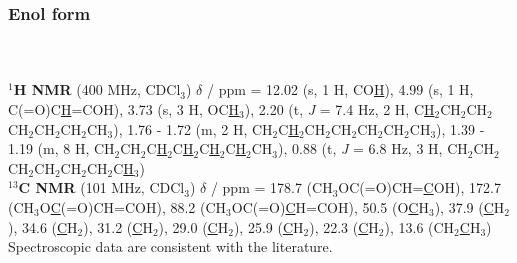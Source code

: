 \subsubsection*{Enol form }
\\[1\baselineskip]
\\[1\baselineskip]
\textbf{$^{1}$H NMR} (400 MHz, CDCl$_3$) $\delta$ / ppm = 
	12.02 (s, 1 H, CO\underline{H}), 
	4.99 (s, 1 H, C(=O)C\underline{H}=COH),
	3.73 (s, 3 H, OC\underline{H}$_3$), 
	2.20 (t, \textit{J} = 7.4 Hz, 2 H, C\underline{H}$_2$CH$_2$CH$_2$CH$_2$CH$_2$CH$_2$CH$_3$), 
	1.76 - 1.72 (m, 2 H, CH$_2$C\underline{H}$_2$CH$_2$CH$_2$CH$_2$CH$_2$CH$_3$),
	1.39 - 1.19 (m, 8 H, CH$_2$CH$_2$C\underline{H}$_2$C\underline{H}$_2$C\underline{H}$_2$C\underline{H}$_2$CH$_3$), 
	0.88 (t, \textit{J} = 6.8 Hz, 3 H, CH$_2$CH$_2$CH$_2$CH$_2$CH$_2$CH$_2$C\underline{H}$_3$)
	\\[1\baselineskip]
\textbf{$^{13}$C NMR} (101 MHz, CDCl$_3$) $\delta$ / ppm = 
	178.7 (CH$_3$OC(=O)CH=\underline{C}OH), 
	172.7 (CH$_3$O\underline{C}(=O)CH=COH), 
	88.2 (CH$_3$OC\-(=O)\underline{C}H=COH), 
	50.5 (O\underline{C}H$_3$),
	37.9 (\underline{C}H$_2$), 
	34.6 (\underline{C}H$_2$), 
	31.2 (\underline{C}H$_2$), 
	29.0 (\underline{C}H$_2$), 
	25.9 (\underline{C}H$_2$), 
	22.3 (\underline{C}H$_2$), 
	13.6 (CH$_2$\underline{C}H$_3$)
\\[1\baselineskip]
Spectroscopic data are consistent with the literature\cite{Baker2012,Scribner1978}.


